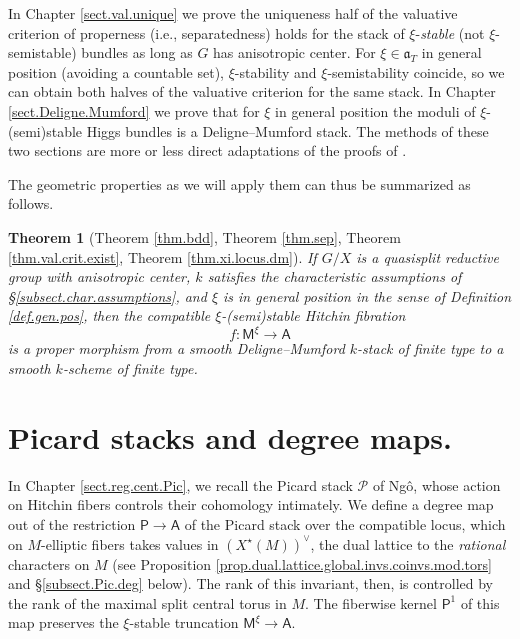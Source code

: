 \documentclass[openany]{amsbook}
\newtheorem{theorem}{Theorem}[chapter]
\theoremstyle{definition}
\theoremstyle{remark}
\numberwithin{equation}{section}
\newcommand{\cP}{\mathcal{P}}
\renewcommand{\-}{\operatorname{-}}
\renewcommand{\a}{\mathfrak{a}}
\newcommand{\bM}{\mathsf{M}}
\newcommand{\bA}{\mathsf{A}}
\newcommand{\bP}{\mathsf{P}}
\begin{document}
In Chapter \ref{sect.val.unique} we prove the uniqueness half of the valuative criterion of properness (i.e., separatedness) holds for the stack of $\xi$-\textit{stable} (not $\xi$-semistable) bundles as long as $G$ has anisotropic center. For $\xi \in \a_T$ in general position (avoiding a countable set), $\xi$-stability and $\xi$-semistability coincide, so we can obtain both halves of the valuative criterion for the same stack. In Chapter \ref{sect.Deligne.Mumford} we prove that for $\xi$ in general position the moduli of $\xi$-(semi)stable Higgs bundles is a Deligne--Mumford stack. The methods of these two sections are more or less direct adaptations of the proofs of \cite{CLI}. 

The geometric properties as we will apply them can thus be summarized as follows.
\begin{theorem}[{Theorem \ref{thm.bdd}, Theorem \ref{thm.sep}, Theorem \ref{thm.val.crit.exist}, Theorem \ref{thm.xi.locus.dm}}]
    If $G/X$ is a quasisplit reductive group with anisotropic center, $k$ satisfies the characteristic assumptions of \S \ref{subsect.char.assumptions}, and $\xi$ is in \emph{general position} in the sense of Definition \ref{def.gen.pos}, then the compatible $\xi$-(semi)stable Hitchin fibration
    $$
        f : \bM^\xi \to \bA
    $$
    is a proper morphism from a smooth Deligne--Mumford $k$-stack of finite type to a smooth $k$-scheme of finite type.
\end{theorem}


\section{Picard stacks and degree maps.}

In Chapter \ref{sect.reg.cent.Pic}, we recall the Picard stack $\cP$ of Ng\^{o}, whose action on Hitchin fibers controls their cohomology intimately. We define a degree map out of the restriction $\bP \to \bA$ of the Picard stack over the compatible locus, which on $M$-elliptic fibers takes values in $(X^\star(M))^\vee$, the dual lattice to the \textit{rational} characters on $M$ (see Proposition \ref{prop.dual.lattice.global.invs.coinvs.mod.tors} and \S \ref{subsect.Pic.deg} below). The rank of this invariant, then, is controlled by the rank of the maximal split central torus in $M$. The fiberwise kernel $\bP^{1}$ of this map preserves the $\xi$-stable truncation $\bM^{\xi} \to \bA$. 
\end{document}
